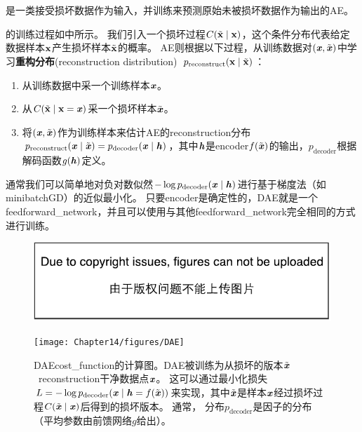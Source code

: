 \section{}
\label{sec:denoising_autoencoders}
是一类接受损坏数据作为输入，并训练来预测原始未被损坏数据作为输出的\gls{AE}。


的训练过程如中所示。
我们引入一个损坏过程$C(\tilde{\mathbf{x}} \mid \mathbf{x})$，这个条件分布代表给定数据样本$\mathbf{x}$产生损坏样本$\tilde {\mathbf{x}}$的概率。
\gls{AE}则根据以下过程，从训练数据对$(\boldsymbol{\mathit{x}}, \tilde {\boldsymbol{\mathit{x}}})$中学习\textbf{重构分布}(reconstruction distribution)~$p_{\text{reconstruct}} (\mathbf{x} \mid \tilde {\mathbf{x}})$：
\begin{enumerate}
\item 从训练数据中采一个训练样本$\boldsymbol{\mathit{x}}$。
\item 从$C(\tilde{\mathbf{x}} \mid \mathbf{x}=\boldsymbol{\mathit{x}})$采一个损坏样本$\tilde {\boldsymbol{\mathit{x}}}$。
\item 将$(\boldsymbol{\mathit{x}}, \tilde {\boldsymbol{\mathit{x}}})$作为训练样本来估计\gls{AE}的\gls{reconstruction}分布 
$p_{\text{reconstruct}} (\boldsymbol{\mathit{x}} \mid \tilde {\boldsymbol{\mathit{x}}}) = p_{\text{decoder}}(\boldsymbol{\mathit{x}} \mid\boldsymbol{\mathit{h}})$，其中$\boldsymbol{\mathit{h}}$是\gls{encoder}$f(\tilde {\boldsymbol{\mathit{x}}})$的输出，$p_{\text{decoder}}$根据解码函数$g(\boldsymbol{\mathit{h}})$定义。
\end{enumerate}
通常我们可以简单地对负对数似然$-\log p_{\text{decoder}} (\boldsymbol{\mathit{x}} \mid \boldsymbol{\mathit{h}})$进行基于梯度法（如\gls{minibatch}\gls{GD}）的近似最小化。
只要\gls{encoder}是确定性的，\gls{DAE}就是一个\gls{feedforward_network}，并且可以使用与其他\gls{feedforward_network}完全相同的方式进行训练。

\begin{figure}[!htb]
\ifOpenSource
\centerline{\includegraphics{figure.pdf}}
\else
\centerline{\texttt{[image: Chapter14/figures/DAE]}}
\fi
\caption{\gls{DAE}\gls{cost_function}的计算图。\gls{DAE}被训练为从损坏的版本$\tilde {\boldsymbol{\mathit{x}}}$~\gls{reconstruction}干净数据点$\boldsymbol{\mathit{x}}$。
这可以通过最小化损失$L = - \log p_{\text{decoder}} (\boldsymbol{\mathit{x}} \mid \boldsymbol{\mathit{h}} = f(\tilde {\boldsymbol{\mathit{x}}}))$来实现，其中$\tilde {\boldsymbol{\mathit{x}}}$是样本$\boldsymbol{\mathit{x}}$经过损坏过程$C (\tilde {\boldsymbol{\mathit{x}}} \mid \boldsymbol{\mathit{x}})$后得到的损坏版本。
通常， 分布$p_{\text{decoder}}$是因子的分布（平均参数由前馈网络$g$给出）。
}
\label{fig:chap14_DAE}
\end{figure}

